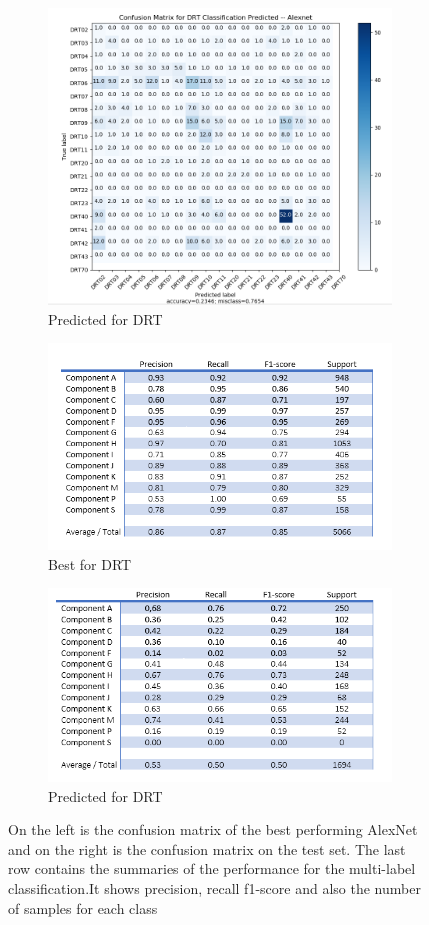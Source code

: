 \begin{figure}
\begin{subfigure}{.5\textwidth}
  \includegraphics[width=.8\linewidth]{figures/04-al_predicted_drt.PNG}
  \caption{Predicted for DRT}
  \label{fig:alcmpred_drt}
\end{subfigure}
\begin{subfigure}{.5\textwidth}
  \centering
  \includegraphics[width=.8\linewidth]{figures/04-al_compo_best.PNG}
  \caption{Best for DRT}
  \label{fig:alcompo_best}
\end{subfigure}%
\begin{subfigure}{.5\textwidth}
  \centering
  \includegraphics[width=.8\linewidth]{figures/04-al_compo_pred.PNG}
  \caption{Predicted for DRT}
  \label{fig:alcompo_pred}
\end{subfigure}
\caption[Confusion matrices of classes trained on AlexNet]{On the left is the confusion matrix of the best performing AlexNet and on the right is the confusion matrix on the test set. The last row contains the summaries of the performance for the multi-label classification.It shows precision, recall f1-score and also the number of samples for each class}
\label{fig:alexcm}
\end{figure}


